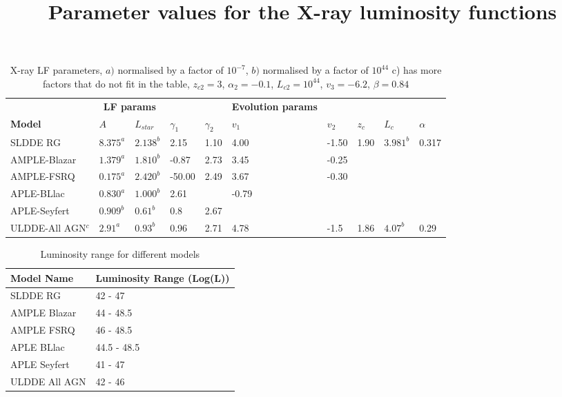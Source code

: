 \documentclass{article}
\begin{document}
\begin{table}
\centering
\title{Parameter values for the X-ray luminosity functions}
\begin{tabularx}{\textwidth}{|l|XXXX|XXXXX|}
\hline

& \multicolumn{2}{c}{\textbf{LF params}} &&&  \textbf{Evolution params} &&&&\\

\textbf{Model} & $A$ & $L_{star}$ & $\gamma _1$ &  $\gamma _2$  & $v_1$ & $v_2$ & $z_c$ & $L_c$ & $ \alpha$\\
\hline
SLDDE RG & $8.375^a$ & $2.138^b$ & 2.15 & 1.10 & 4.00 & -1.50 & 1.90 & $3.981^b$ & 0.317  \\

AMPLE-Blazar & $1.379^a$ & $1.810^b$ & -0.87 & 2.73 & 3.45 & -0.25 & & &  \\

AMPLE-FSRQ & $0.175^a$ & $2.420^b$ & -50.00 & 2.49 & 3.67 & -0.30 & & &  \\

APLE-BLlac & $0.830^a$& $1.000^b$ & 2.61 & &-0.79& & & &  \\
APLE-Seyfert & $0.909^b$ & $0.61^b$ & 0.8 & 2.67& & & & &  \\
ULDDE-All AGN$^c$ & $2.91^a$ & $0.93^b$ & 0.96 & 2.71& 4.78 &-1.5 &1.86 &$4.07^b$ &0.29  \\
\hline
\end{tabularx}
\caption{X-ray LF parameters, $a)$ normalised by a factor of $10^{-7}$, $b)$ normalised by a factor of $10^{44}$
c) has more factors that do not fit in the table, $z_{c2} = 3$, $\alpha_2 =-0.1$, $L_{c2} = 10^{44}$, $v_3 = -6.2 $, $\beta=0.84$ }
\label{tab:xray_lf}
\end{table}

\begin{table}
    \centering
    \begin{tabular}{ll}
    \hline
     Model Name   & Luminosity Range (Log(L))  \\
    \hline
     SLDDE RG     & 42 - 47            \\
     AMPLE Blazar & 44 - 48.5          \\
     AMPLE FSRQ   & 46 - 48.5          \\
     APLE BLlac   & 44.5 - 48.5        \\
     APLE Seyfert & 41 - 47          \\
     ULDDE All AGN & 42 - 46 \\
    \hline

\end{tabular}
\caption{Luminosity range for different models}

\label{tab:lum_range}

\end{table}
\end{document}
